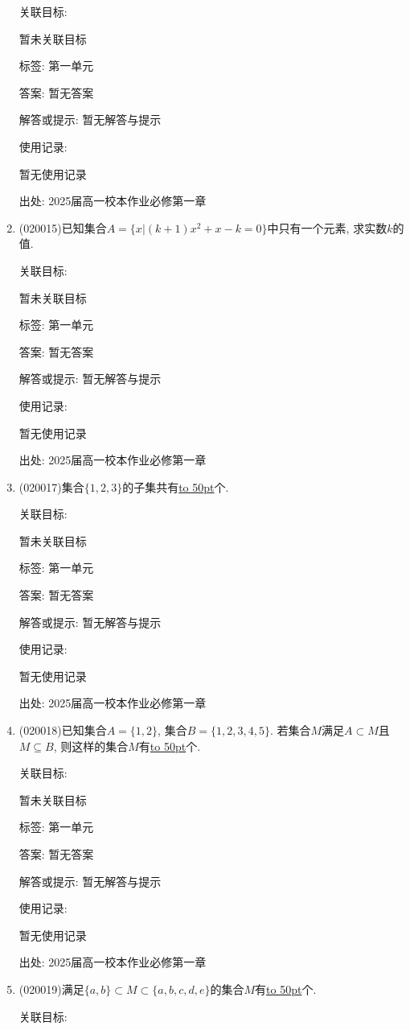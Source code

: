 \documentclass[10pt,a4paper]{article}
\newcommand{\blank}[1]{\underline{\hbox to #1pt{}}}
\begin{document}
\begin{enumerate}[1.]
关联目标:

暂未关联目标



标签: 第一单元

答案: 暂无答案

解答或提示: 暂无解答与提示

使用记录:

暂无使用记录


出处: 2025届高一校本作业必修第一章
\item { (020015)}已知集合$A=\{x|(k+1)x^2+x-k=0\}$中只有一个元素, 求实数$k$的值.


关联目标:

暂未关联目标



标签: 第一单元

答案: 暂无答案

解答或提示: 暂无解答与提示

使用记录:

暂无使用记录


出处: 2025届高一校本作业必修第一章
\item { (020017)}集合$\{1,2,3\}$的子集共有\blank{50}个.


关联目标:

暂未关联目标



标签: 第一单元

答案: 暂无答案

解答或提示: 暂无解答与提示

使用记录:

暂无使用记录


出处: 2025届高一校本作业必修第一章
\item { (020018)}已知集合$A=\{1,2\}$, 集合$B=\{1,2,3,4,5\}$. 若集合$M$满足$A\subset M$且$M\subseteq B$, 则这样的集合$M$有\blank{50}个.


关联目标:

暂未关联目标



标签: 第一单元

答案: 暂无答案

解答或提示: 暂无解答与提示

使用记录:

暂无使用记录


出处: 2025届高一校本作业必修第一章
\item { (020019)}满足$\{a, b\}\subset M \subset\{a, b, c, d, e\}$的集合$M$有\blank{50}个.


关联目标:


\end{enumerate}
\end{document}
